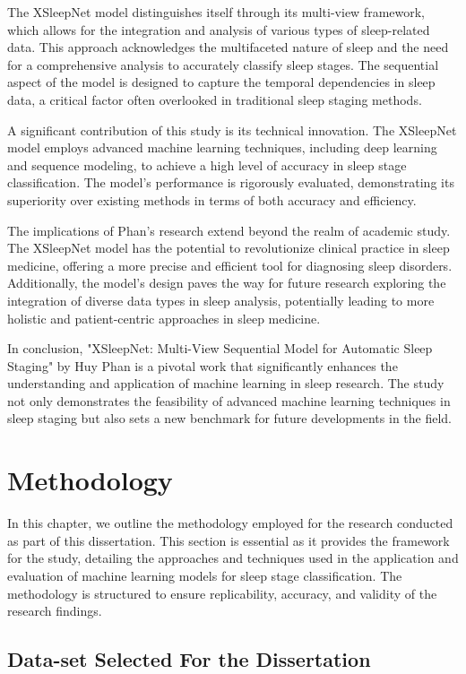 \documentclass[12pt, a4paper,oneside]{book}
\numberwithin{equation}{section}
\begin{document}
The XSleepNet model distinguishes itself through its multi-view framework, which allows for the integration and analysis of various types of sleep-related data. This approach acknowledges the multifaceted nature of sleep and the need for a comprehensive analysis to accurately classify sleep stages. The sequential aspect of the model is designed to capture the temporal dependencies in sleep data, a critical factor often overlooked in traditional sleep staging methods.\cite{Phan2021XSleepNet}

A significant contribution of this study is its technical innovation. The XSleepNet model employs advanced machine learning techniques, including deep learning and sequence modeling, to achieve a high level of accuracy in sleep stage classification. The model’s performance is rigorously evaluated, demonstrating its superiority over existing methods in terms of both accuracy and efficiency.\cite{Phan2021XSleepNet}

The implications of Phan's research extend beyond the realm of academic study. The XSleepNet model has the potential to revolutionize clinical practice in sleep medicine, offering a more precise and efficient tool for diagnosing sleep disorders. Additionally, the model's design paves the way for future research exploring the integration of diverse data types in sleep analysis, potentially leading to more holistic and patient-centric approaches in sleep medicine.\cite{Phan2021XSleepNet}

In conclusion, "XSleepNet: Multi-View Sequential Model for Automatic Sleep Staging" by Huy Phan  is a pivotal work that significantly enhances the understanding and application of machine learning in sleep research. The study not only demonstrates the feasibility of advanced machine learning techniques in sleep staging but also sets a new benchmark for future developments in the field.\cite{Phan2021XSleepNet}
\chapter{Methodology}\label{ch:3}
In this chapter, we outline the methodology employed for the research conducted as part of this dissertation. This section is essential as it provides the framework for the study, detailing the approaches and techniques used in the application and evaluation of machine learning models for sleep stage classification. The methodology is structured to ensure replicability, accuracy, and validity of the research findings.

\section{Data-set Selected  For the Dissertation }\label{sec:3.1}
\end{document}
